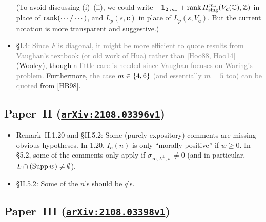 \documentclass[12pt]{article}
\begin{document}
\begin{itemize}
    (To avoid discussing (i)--(ii),
    we could write $-\bm{1}_{2\mid m_\ast} + \operatorname{rank} H^{m_\ast}_\textnormal{sing}(V_{\bm{c}}(\mathbb{C}),\mathbb{Z})$ in place of $\operatorname{rank}(\cdots/\cdots)$,
    and $L_p(s,\bm{c})$ in place of $L_p(s,V_{\bm{c}})$.
    But the current notation is more transparent and suggestive.)
    
    \item \S{I.4}:
    \textcolor{gray}{Since $F$ is diagonal, it might be more efficient to quote results from Vaughan's textbook (or old work of Hua) rather than [Hoo88, Hoo14]} (Wooley),
    though \textcolor{gray}{a little care is needed since Vaughan focuses on Waring's problem}.
    Furthermore, \textcolor{gray}{the case $m\in \{4,6\}$ (and essentially $m=5$ too) can be quoted} from [HB98].
    
\end{itemize}

\subsection{Paper~II (\href{https://arxiv.org/abs/2108.03396v1}{\texttt{arXiv:2108.03396v1}})}

\begin{itemize}
    \item Remark~II.1.20 and \S{II.5.2}:
    Some (purely expository) comments are missing obvious hypotheses.
    In 1.20, $I_{\bm{c}}(n)$ is only ``morally positive'' if $w\geq 0$.
    In \S5.2, some of the comments only apply if $\sigma_{\infty,L^\perp,w}\neq 0$ (and in particular, $L\cap (\operatorname{Supp}{w})\neq \emptyset$).
    
    \item \S{II.5.2}:
    Some of the $n$'s should be $q$'s.
\end{itemize}

\subsection{Paper~III (\href{https://arxiv.org/abs/2108.03398v1}{\texttt{arXiv:2108.03398v1}})}
\end{document}
